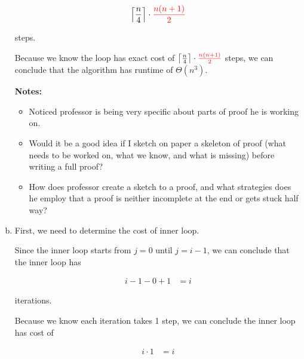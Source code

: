 \documentclass[12pt]{article}
\begin{document}
\begin{enumerate}[a.]
\begin{mdframed}
        \begin{align}
            \left\lceil \frac{n}{4} \right\rceil \cdot \color{red}\frac{n(n+1)}{2}\color{black}
        \end{align}

        steps.

        \bigskip

        Because we know the loop has exact cost of $\left\lceil \frac{n}{4}
        \right\rceil \cdot \color{red}\frac{n(n+1)}{2}\color{black}$ steps, we
        can conclude that the algorithm has runtime of $\Theta(n^3)$.

    \end{mdframed}

    \textbf{Notes:}

    \begin{itemize}
        \item Noticed professor is being very specific about parts of proof he is working on.

        \item Would it be a good idea if I sketch on paper a skeleton of proof (what needs
        to be worked on, what we know, and what is missing) before writing a full proof?

        \item How does professor create a sketch to a proof, and what strategies does he
        employ that a proof is neither incomplete at the end or gets stuck half way?

    \end{itemize}

    \item

    First, we need to determine the cost of inner loop.

    \bigskip

    Since the inner loop starts from $j = 0$ until $j = i - 1$, we can conclude
    that the inner loop has

    \setcounter{equation}{0}
    \begin{align}
        i - 1 - 0 + 1 &= i
    \end{align}

    iterations.

    \bigskip

    Because we know each iteration takes 1 step, we can conclude the inner
    loop has cost of

    \begin{align}
        i \cdot 1 &= i
    \end{align}


\end{enumerate}
\end{document}
